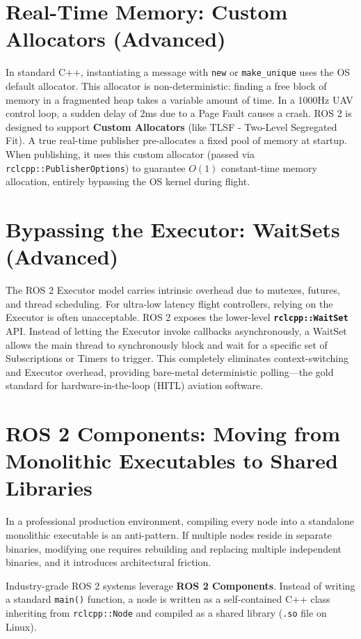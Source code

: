 \documentclass{article}
\begin{document}
\section{Real-Time Memory: Custom Allocators (Advanced)}
In standard C++, instantiating a message with \texttt{new} or \texttt{make\_unique} uses the OS default allocator. This allocator is non-deterministic: finding a free block of memory in a fragmented heap takes a variable amount of time. In a 1000Hz UAV control loop, a sudden delay of 2ms due to a Page Fault causes a crash.
ROS 2 is designed to support \textbf{Custom Allocators} (like TLSF - Two-Level Segregated Fit). A true real-time publisher pre-allocates a fixed pool of memory at startup. When publishing, it uses this custom allocator (passed via \texttt{rclcpp::PublisherOptions}) to guarantee $O(1)$ constant-time memory allocation, entirely bypassing the OS kernel during flight.

\section{Bypassing the Executor: WaitSets (Advanced)}
The ROS 2 Executor model carries intrinsic overhead due to mutexes, futures, and thread scheduling. For ultra-low latency flight controllers, relying on the Executor is often unacceptable.
ROS 2 exposes the lower-level \textbf{\texttt{rclcpp::WaitSet}} API. Instead of letting the Executor invoke callbacks asynchronously, a WaitSet allows the main thread to synchronously block and wait for a specific set of Subscriptions or Timers to trigger. This completely eliminates context-switching and Executor overhead, providing bare-metal deterministic polling—the gold standard for hardware-in-the-loop (HITL) aviation software.

\section{ROS 2 Components: Moving from Monolithic Executables to Shared Libraries}
In a professional production environment, compiling every node into a standalone monolithic executable is an anti-pattern. If multiple nodes reside in separate binaries, modifying one requires rebuilding and replacing multiple independent binaries, and it introduces architectural friction. 

Industry-grade ROS 2 systems leverage \textbf{ROS 2 Components}. Instead of writing a standard \texttt{main()} function, a node is written as a self-contained C++ class inheriting from \texttt{rclcpp::Node} and compiled as a shared library (\texttt{.so} file on Linux). 
\end{document}
